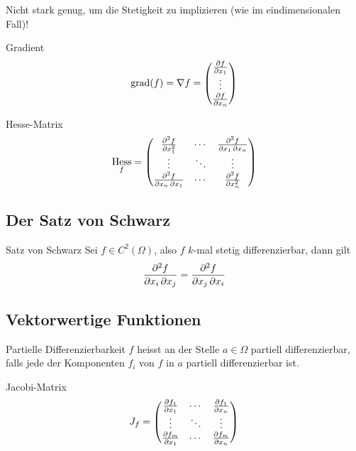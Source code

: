 \documentclass[a4paper,10pt]{article}
\DeclareMathOperator{\gradient}{grad}
\DeclareMathOperator{\Hess}{Hess}
\begin{document}
Nicht stark genug, um die Stetigkeit zu implizieren (wie im eindimensionalen Fall)!

\begin{mainbox}{Gradient}
    \[
        \gradient(f) = \nabla f = \begin{pmatrix}
            \pdv{f}{x_1} \\
            \vdots \\
            \pdv{f}{x_n}
        \end{pmatrix}
    \]
\end{mainbox}

\begin{mainbox}{Hesse-Matrix}
    \[
        \Hess_f = \begin{pmatrix}
            \pdv[order=2]{f}{x_1} & \cdots & \pdv{f}{x_1,x_n} \\
            \vdots & \ddots & \vdots \\
            \pdv{f}{x_n,x_1} & \cdots & \pdv[order=2]{f}{x_n}
        \end{pmatrix}
    \]
\end{mainbox}


\subsection{Der Satz von Schwarz}

\begin{mainbox}{Satz von Schwarz}
    Sei \( f \in C^2(\Omega) \), also \( f \) \( k \)-mal stetig differenzierbar, dann gilt
    \[
        \pdv{f}{x_i, x_j} = \pdv{f}{x_j, x_i}
    \]
\end{mainbox}


\subsection{Vektorwertige Funktionen}

\begin{mainbox}{Partielle Differenzierbarkeit}
    \( f \) heisst an der Stelle \( a \in \Omega \) partiell differenzierbar, falls jede der Komponenten \( f_i \) von \( f \) in \( a \) partiell differenzierbar ist.
\end{mainbox}

\begin{mainbox}{Jacobi-Matrix}
    \[
        J_f = \begin{pmatrix}
            \pdv{f_1}{x_1} & \cdots & \pdv{f_1}{x_n} \\
            \vdots & \ddots & \vdots \\
            \pdv{f_m}{x_1} & \cdots & \pdv{f_m}{x_n}
        \end{pmatrix}
    \]
\end{mainbox}
\end{document}
